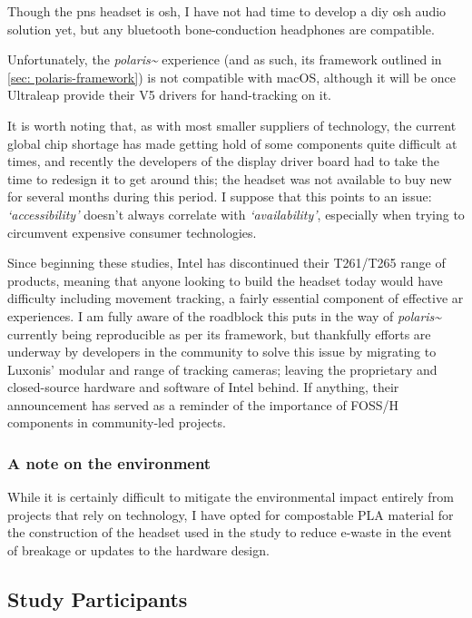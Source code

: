 Though the \gls{pns} headset is \gls{osh}, I have not had time to develop a \gls{diy} \gls{osh} audio solution yet, but any bluetooth bone-conduction headphones are compatible.

Unfortunately, the \textit{polaris\textasciitilde{}} experience (and as such, its framework outlined in \autoref{sec: polaris-framework}) is not compatible with macOS, although it will be once Ultraleap provide their V5 drivers for hand-tracking on it.

It is worth noting that, as with most smaller suppliers of technology, the current global chip shortage has made getting hold of some components quite difficult at times, and recently the developers of the display driver board had to take the time to redesign it to get around this; the headset was not available to buy new for several months during this period. I suppose that this points to an issue: \textit{`accessibility'} doesn't always correlate with \textit{`availability'}, especially when trying to circumvent expensive consumer technologies.

Since beginning these studies, Intel has discontinued their T261/T265 range of products, meaning that anyone looking to build the headset today would have difficulty including movement tracking, a fairly essential component of effective \gls{ar} experiences. I am fully aware of the roadblock this puts in the way of \textit{polaris\textasciitilde{}} currently being reproducible as per its framework, but thankfully efforts are underway by developers in the community to solve this issue by migrating to Luxonis' modular and  range of tracking cameras; leaving the proprietary and closed-source hardware and software of Intel behind. If anything, their announcement has served as a reminder of the importance of FOSS/H components in community-led projects.

\subsubsection{A note on the environment}\label{sec: polaris-ethics-environment}
While it is certainly difficult to mitigate the environmental impact entirely from projects that rely on technology, I have opted for compostable PLA material for the construction of the headset used in the study to reduce e-waste in the event of breakage or updates to the hardware design.

\subsection{Study Participants}\label{sec: polaris-ethics-participants}
